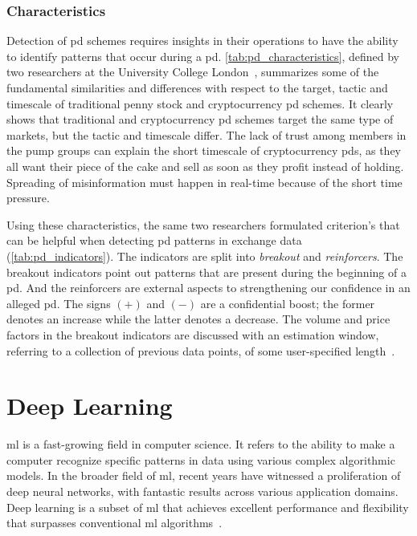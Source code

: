 \subsubsection{Characteristics}
Detection of \ac{pd} schemes requires insights in their operations to have the ability to identify patterns that occur during a \ac{pd}. \autoref{tab:pd_characteristics}, defined by two researchers at the University College London~\cite{P&D_anatomy}, summarizes some of the fundamental similarities and differences with respect to the target, tactic and timescale of traditional penny stock and cryptocurrency \ac{pd} schemes. It clearly shows that traditional and cryptocurrency \ac{pd} schemes target the same type of markets, but the tactic and timescale differ. The lack of trust among members in the pump groups can explain the short timescale of cryptocurrency \acp{pd}, as they all want their piece of the cake and sell as soon as they profit instead of holding. Spreading of misinformation must happen in real-time because of the short time pressure.



Using these characteristics, the same two researchers \cite{P&D_anatomy} formulated criterion's that can be helpful when detecting \ac{pd} patterns in exchange data (\autoref{tab:pd_indicators}). The indicators are split into \emph{breakout} and \emph{reinforcers}. The breakout indicators point out patterns that are present during the beginning of a \ac{pd}. And the reinforcers are external aspects to strengthening our confidence in an alleged \ac{pd}. The signs $(+)$ and $(-)$ are a confidential boost; the former denotes an increase while the latter denotes a decrease. The volume and price factors in the breakout indicators are discussed with an estimation window, referring to a collection of previous data points, of some user-specified length~\cite{P&D_anatomy}.


 
\section{Deep Learning}
\Acf{ml} is a fast-growing field in computer science. It refers to the ability to make a computer recognize specific patterns in data using various complex algorithmic models. In the broader field of \ac{ml}, recent years have witnessed a proliferation of deep neural networks, with fantastic results across various application domains. Deep learning is a subset of \ac{ml} that achieves excellent performance and flexibility that surpasses conventional \ac{ml} algorithms~\cite{mike_voets, dl_anomaly}.


